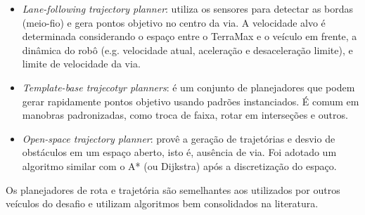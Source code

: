 \begin{itemize}
  \item \textit{Lane-following trajectory planner}: utiliza os sensores para
  detectar as bordas (meio-fio) e gera pontos objetivo no centro da via. A
  velocidade alvo é determinada considerando o espaço entre o TerraMax e o
  veículo em frente, a dinâmica do robô (e.g. velocidade atual,
  aceleração e desaceleração limite), e limite de velocidade da via.
  \item \textit{Template-base trajecotyr planners}: é um conjunto de
  planejadores que podem gerar rapidamente pontos objetivo usando padrões
  instanciados. É comum em manobras padronizadas, como troca de faixa, rotar em
  interseções e outros. 
  \item \textit{Open-space trajectory planner}: provê a geração de trajetórias e
  desvio de obstáculos em um espaço aberto, isto é, ausência de via. Foi adotado
  um algoritmo similar com o A* (ou Dijkstra) após a discretização do espaço.
\end{itemize}

Os planejadores de rota e trajetória são semelhantes aos utilizados por outros
veículos do desafio e utilizam algoritmos bem consolidados na literatura. 
